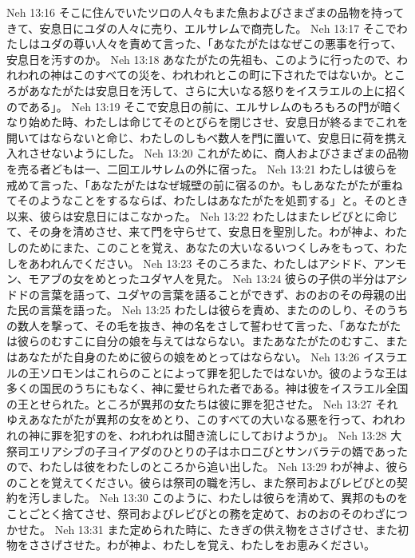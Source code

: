 Neh 13:16  そこに住んでいたツロの人々もまた魚およびさまざまの品物を持ってきて、安息日にユダの人々に売り、エルサレムで商売した。
Neh 13:17  そこでわたしはユダの尊い人々を責めて言った、「あなたがたはなぜこの悪事を行って、安息日を汚すのか。
Neh 13:18  あなたがたの先祖も、このように行ったので、われわれの神はこのすべての災を、われわれとこの町に下されたではないか。ところがあなたがたは安息日を汚して、さらに大いなる怒りをイスラエルの上に招くのである」。
Neh 13:19  そこで安息日の前に、エルサレムのもろもろの門が暗くなり始めた時、わたしは命じてそのとびらを閉じさせ、安息日が終るまでこれを開いてはならないと命じ、わたしのしもべ数人を門に置いて、安息日に荷を携え入れさせないようにした。
Neh 13:20  これがために、商人およびさまざまの品物を売る者どもは一、二回エルサレムの外に宿った。
Neh 13:21  わたしは彼らを戒めて言った、「あなたがたはなぜ城壁の前に宿るのか。もしあなたがたが重ねてそのようなことをするならば、わたしはあなたがたを処罰する」と。そのとき以来、彼らは安息日にはこなかった。
Neh 13:22  わたしはまたレビびとに命じて、その身を清めさせ、来て門を守らせて、安息日を聖別した。わが神よ、わたしのためにまた、このことを覚え、あなたの大いなるいつくしみをもって、わたしをあわれんでください。
Neh 13:23  そのころまた、わたしはアシドド、アンモン、モアブの女をめとったユダヤ人を見た。
Neh 13:24  彼らの子供の半分はアシドドの言葉を語って、ユダヤの言葉を語ることができず、おのおのその母親の出た民の言葉を語った。
Neh 13:25  わたしは彼らを責め、またののしり、そのうちの数人を撃って、その毛を抜き、神の名をさして誓わせて言った、「あなたがたは彼らのむすこに自分の娘を与えてはならない。またあなたがたのむすこ、またはあなたがた自身のために彼らの娘をめとってはならない。
Neh 13:26  イスラエルの王ソロモンはこれらのことによって罪を犯したではないか。彼のような王は多くの国民のうちにもなく、神に愛せられた者である。神は彼をイスラエル全国の王とせられた。ところが異邦の女たちは彼に罪を犯させた。
Neh 13:27  それゆえあなたがたが異邦の女をめとり、このすべての大いなる悪を行って、われわれの神に罪を犯すのを、われわれは聞き流しにしておけようか」。
Neh 13:28  大祭司エリアシブの子ヨイアダのひとりの子はホロニびとサンバラテの婿であったので、わたしは彼をわたしのところから追い出した。
Neh 13:29  わが神よ、彼らのことを覚えてください。彼らは祭司の職を汚し、また祭司およびレビびとの契約を汚しました。
Neh 13:30  このように、わたしは彼らを清めて、異邦のものをことごとく捨てさせ、祭司およびレビびとの務を定めて、おのおのそのわざにつかせた。
Neh 13:31  また定められた時に、たきぎの供え物をささげさせ、また初物をささげさせた。わが神よ、わたしを覚え、わたしをお恵みください。


